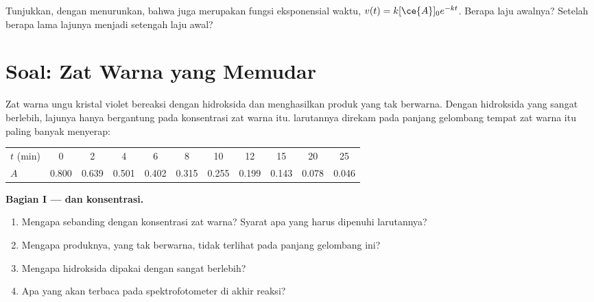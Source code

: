 \begin{exercise}[$\star\star\star$]\label{exo:g12:reaction-rates:15}
Tunjukkan, dengan menurunkan, bahwa  
juga merupakan fungsi eksponensial waktu, $v(t) = k[\ce{A}]_0 e^{-kt}$.
Berapa laju awalnya? Setelah berapa lama lajunya menjadi setengah laju
awal?
\end{exercise}

\section{Soal: Zat Warna yang Memudar}

\begin{problem}
\label{pb:g12:reaction-rates:1}
Zat warna ungu kristal violet bereaksi dengan  hidroksida dan
menghasilkan produk yang tak berwarna. Dengan hidroksida yang sangat
berlebih, lajunya hanya bergantung pada konsentrasi zat warna itu.
 larutannya direkam pada panjang gelombang tempat zat warna itu
paling banyak menyerap:
\begin{center}
\small
\begin{tabular}{l*{10}{c}}
\hline
$t$ (\si{min}) & 0 & 2 & 4 & 6 & 8 & 10 & 12 & 15 & 20 & 25 \\
$A$ & 0.800 & 0.639 & 0.501 & 0.402 & 0.315 & 0.255 & 0.199 & 0.143 &
0.078 & 0.046 \\
\hline
\end{tabular}
\end{center}

\medskip
\noindent\textbf{Bagian I ---  dan konsentrasi.}
\begin{enumerate}
  \item Mengapa  sebanding dengan konsentrasi zat warna? Syarat
        apa yang harus dipenuhi larutannya?
  \item Mengapa produknya, yang tak berwarna, tidak terlihat pada
        panjang gelombang ini?
  \item Mengapa hidroksida dipakai dengan sangat berlebih?
  \item Apa yang akan terbaca pada spektrofotometer di akhir reaksi?
\end{enumerate}


\end{problem}
